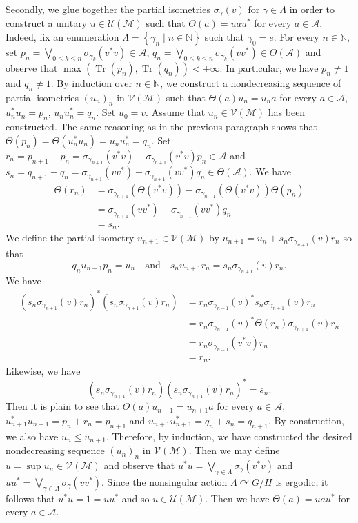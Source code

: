 \documentclass[11pt]{amsart}
\numberwithin{equation}{section}
\theoremstyle{plain}
\theoremstyle{definition}
\newcommand{\N}{\mathbb{N}}
\newcommand{\Tr}{\operatorname{Tr}}
\begin{document}
Secondly, we glue together the partial isometries $\sigma_\gamma(v)$ for $\gamma \in \Lambda$ in order to construct a unitary $u \in \mathscr U(\mathscr M)$ such that $\Theta(a) = u a u^*$ for every $a \in \mathscr A$. Indeed, fix an enumeration $\Lambda = \left\{ \gamma_n \mid n \in \N \right\}$ such that $\gamma_0 = e$. For every $n \in \N$, set $p_n = \bigvee_{0 \leq k \leq n} \sigma_{\gamma_k}(v^*v) \in \mathscr A$, $q_n = \bigvee_{0 \leq k \leq n} \sigma_{\gamma_k}(vv^*) \in \Theta(\mathscr A)$ and observe that $\max(\Tr(p_n), \Tr(q_n)) < +\infty$. In particular, we have $p_n \neq 1$ and $q_n \neq 1$. By induction over $n \in \N$, we construct a nondecreasing sequence of partial isometries $(u_n)_n$ in $\mathscr V(\mathscr M)$ such that $\Theta(a)u_n = u_n a$ for every $a \in \mathscr A$, $u_n^* u_n = p_n$, $u_n u_n^* = q_n$. Set $u_0 = v$. Assume that $u_n \in \mathscr V(\mathscr M)$ has been constructed. The same reasoning as in the previous paragraph shows that $\Theta(p_n) = \Theta(u_n^*u_n) = u_nu_n^* = q_n$. Set $r_n = p_{n+1} - p_n = \sigma_{\gamma_{n + 1}}(v^*v) - \sigma_{\gamma_{n + 1}}(v^*v)p_n \in \mathscr A$ and $s_n = q_{n+1} - q_n = \sigma_{\gamma_{n + 1}}(vv^*) - \sigma_{\gamma_{n + 1}}(vv^*)q_n \in \Theta(\mathscr A)$. We have 
\begin{align*}
\Theta(r_n) &= \sigma_{\gamma_{n + 1}}(\Theta(v^*v)) - \sigma_{\gamma_{n + 1}}(\Theta(v^*v)) \Theta(p_n) \\
&= \sigma_{\gamma_{n + 1}}(vv^*) - \sigma_{\gamma_{n + 1}}(vv^*)q_n \\
&= s_n.
\end{align*}
We define the partial isometry $u_{n + 1} \in \mathscr V(\mathscr M)$ by $u_{n + 1} = u_n + s_n \sigma_{\gamma_{n + 1}}(v) r_n$ so that
$$q_nu_{n + 1}p_n = u_n \quad \text{and} \quad s_n u_{n + 1} r_n = s_n \sigma_{\gamma_{n + 1}}(v) r_n.$$
We have
\begin{align*}
(s_n \sigma_{\gamma_{n + 1}}(v) r_n)^* (s_n \sigma_{\gamma_{n + 1}}(v) r_n) &= r_n  \sigma_{\gamma_{n + 1}}(v)^* s_n  \sigma_{\gamma_{n + 1}}(v) r_n \\
&= r_n  \sigma_{\gamma_{n + 1}}(v)^* \Theta(r_n)  \sigma_{\gamma_{n + 1}}(v) r_n \\
&= r_n  \sigma_{\gamma_{n + 1}}(v^*v) r_n \\
&= r_n.
\end{align*} 
Likewise, we have 
$$(s_n \sigma_{\gamma_{n + 1}}(v) r_n) (s_n \sigma_{\gamma_{n + 1}}(v) r_n)^* = s_n.$$ 
Then it is plain to see that $\Theta(a)u_{n + 1} = u_{n + 1} a$ for every $a \in \mathscr A$, $u_{n + 1}^* u_{n + 1} = p_n + r_n = p_{n + 1}$ and $u_{n+1} u_{n+1}^* = q_n + s_n = q_{n + 1}$. By construction, we also have $u_n \leq u_{n+1}$. Therefore, by induction, we have constructed the desired nondecreasing sequence $(u_n)_n$ in $\mathscr V(\mathscr M)$. Then we may define $u = \sup u_n \in \mathscr V(\mathscr M)$ and observe that $u^*u = \bigvee_{\gamma \in \Lambda} \sigma_\gamma(v^*v)$ and $uu^* = \bigvee_{\gamma \in \Lambda} \sigma_\gamma(vv^*)$. Since the nonsingular action $\Lambda \curvearrowright G/H$ is ergodic, it follows that $u^*u = 1 = uu^*$ and so $u \in \mathscr U(\mathscr M)$. Then we have $\Theta(a) = u a u^*$ for every $a \in \mathscr A$.
\end{document}
